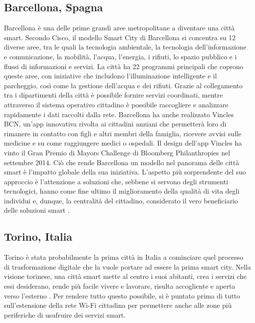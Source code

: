 \subsection{Barcellona, Spagna}
Barcellona è una delle prime grandi aree metropolitane a diventare una città smart. Secondo Cisco\cite{theEconomicAndSocialValue}, il modello Smart City di Barcellona si concentra su 12 diverse aree, tra le quali la tecnologia ambientale, la tecnologia dell’informazione e comunicazione, la mobilità, l’acqua, l’energia, i rifiuti, lo spazio pubblico e i flussi di informazioni e servizi. La città ha 22 programmi principali che coprono queste aree, con iniziative che includono l'illuminazione intelligente e il parcheggio, così come la gestione dell'acqua e dei rifiuti. Grazie al collegamento tra i dipartimenti della città è possibile fornire servizi coordinati, mentre attraverso il sistema operativo cittadino è possibile raccogliere e analizzare rapidamente i dati raccolti dalla rete.
Barcellona ha anche realizzato Vincles BCN, un'app innovativa rivolta ai cittadini anziani che permetterà loro di rimanere in contatto con figli e altri membri della famiglia, ricevere avvisi sulle medicine e su come raggiungere medici o ospedali. Il design dell'app Vincles ha vinto il Gran Premio di Mayors Challenge di Bloomberg Philanthropies nel settembre 2014.
Ciò che rende Barcellona un modello nel panorama delle città smart è l’impatto globale della sua iniziativa. L’aspetto più sorprendente del suo approccio è l’attenzione a soluzioni che, sebbene si servono degli strumenti tecnologici, hanno come fine ultimo il miglioramento della qualità di vita degli individui  e, dunque, la centralità del cittadino, considerato il vero beneficiario delle soluzioni smart \cite{theEconomicAndSocialValue}. 

\subsection{Torino, Italia}
Torino è stata probabilmente la prima città in Italia a cominciare quel processo di trasformazione digitale che la vuole portare ad essere la prima smart city.
Nella visione torinese, una città smart mette al centro i suoi abitanti, crea i servizi che essi desiderano, rende più facile vivere e lavorare, risulta accogliente e aperta verso l’esterno \cite{SmartCityTorino}.
Per rendere tutto questo possibile, si è puntato prima di tutto sull'estensione della rete Wi-Fi cittadina per permettere anche alle zone più periferiche di usufruire dei servizi smart. 

